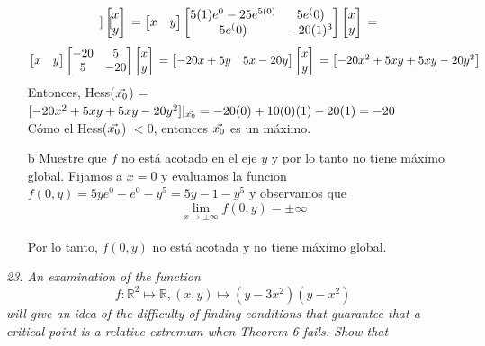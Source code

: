 \documentclass[a4paper,12pt]{article}
\begin{document}
\begin{itemize}
\[\begin{bmatrix}
	\end{bmatrix}
	\begin{bmatrix}
	x \\ y
	\end{bmatrix}\\
	=
	\begin{bmatrix}
	x & y
	\end{bmatrix}
	\begin{bmatrix}
	    5(1)e^0 - 25e^{5(0)} & 5e^(0)\\
		5e^(0) & -20(1)^3\\
	\end{bmatrix}
	\begin{bmatrix}
	x \\ y
	\end{bmatrix}\\
	=
	\]
	\[
	\begin{bmatrix}
	x & y
	\end{bmatrix}
	\begin{bmatrix}
	    -20 & 5\\
		5 & -20\\
	\end{bmatrix}
	\begin{bmatrix}
	x \\ y
	\end{bmatrix}\\
	=
	\begin{bmatrix}
	-20x + 5y & 5x - 20y
	\end{bmatrix}
	\begin{bmatrix}
	x \\ y
	\end{bmatrix}\\
	=
	\begin{bmatrix}
	-20x^2+5xy+5xy-20y^2
	\end{bmatrix}
	\]
	Entonces, Hess($\vec{x_0}$) = $[-20x^2+5xy+5xy-20y^2]|_{\vec{x_0}} = -20(0)+10(0)(1)-20(1) = -20$\\
	Cómo el Hess($\vec{x_0}$) $< 0$, entonces $\vec{x_0}$ es un máximo.
	\item[b] Muestre que $f$ no está acotado en el eje $y$ y por lo tanto no tiene máximo global.
	Fijamos a $x = 0$ y evaluamos la funcion $f(0,y)= 5ye^0-e^0-y^5 = 5y-1-y^5$ y observamos que \[ \lim_{x \to \pm \infty} f(0,y) = \pm \infty \]\\
	Por lo tanto, $f(0,y)$ no está acotada y no tiene máximo global.

\end{itemize}

\textit{23. An examination of the function}
	$$f:\mathbb{R}^2 \mapsto \mathbb{R}, (x, y) \mapsto (y -3x^2)(y -x^2)$$
	\textit{will give an idea of the difficulty of finding conditions that
			guarantee that a critical point is a relative extremum when Theorem
			6 fails. Show that}\\
\end{document}
